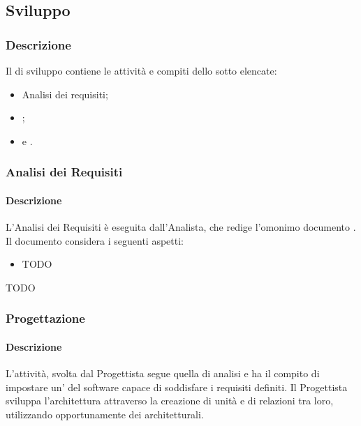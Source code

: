 \subsection{Sviluppo}\label{sviluppo}

\subsubsection{Descrizione}
Il  di sviluppo contiene le attività e compiti dello  sotto elencate:
\begin{itemize}
  \item Analisi dei requisiti;
  \item {};
  \item {} e .
\end{itemize}


\subsubsection{Analisi dei Requisiti}\label{analisi}
\paragraph{Descrizione}
L'Analisi dei Requisiti è eseguita dall'Analista, che redige l'omonimo documento \AdR. Il documento considera i seguenti aspetti:
\begin{itemize}
  \item TODO %
\end{itemize}

TODO %

\subsubsection{Progettazione}\label{progettazione}
\paragraph{Descrizione}
L'attività, svolta dal Progettista segue quella di analisi e ha il compito di impostare un' del software capace di soddisfare i requisiti definiti. Il Progettista sviluppa l'architettura attraverso la creazione di unità e di relazioni tra loro, utilizzando opportunamente dei  architetturali.\\

